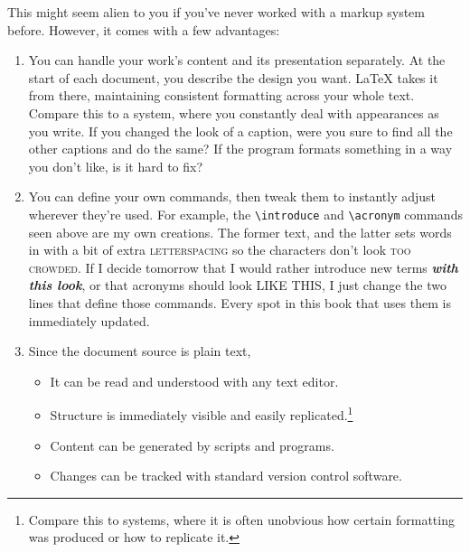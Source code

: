 This might seem alien to you if you've never worked with a markup system before.
However, it comes with a few advantages:
\begin{enumerate}
\item You can handle your work's content and its presentation separately.
    At the start of each document,
    you describe the design you want.
    \LaTeX{} takes it from there, maintaining consistent
    formatting across your whole text.
    Compare this to a  system,
    where you constantly deal with appearances
    as you write.
    If you changed the look of a caption,
    were you sure to find all the other captions and do the
    same?
    If the program formats something in a way you don't like,
    is it hard to fix?%

\item You can define your own commands, then tweak them to instantly adjust
    wherever they're used.
    For example, the \verb|\introduce| and \verb|\acronym| commands seen above
    are my own creations.
    The former  text, and the latter sets words in
     with a bit of extra
    \mbox{\textsc{letterspacing}} so the characters
    don't look \textsc{too crowded}.
    If I decide tomorrow that I would rather introduce new terms
    \textbf{\itshape with this look}, or that acronyms should look
    {\small{} LIKE THIS},
    I just change the two lines that define those commands.
    Every spot in this book that uses them is immediately updated.

\item Since the document source is plain text,
    \begin{itemize}
    \item It can be read and understood with any text editor.
    \item Structure is immediately visible
        and easily replicated.\punckern\footnote{Compare this to
         systems, where it is often unobvious
        how certain formatting was produced or how to replicate it.}
    \item Content can be generated by scripts and programs.
    \item Changes can be tracked with standard version control software.
    \end{itemize}
\end{enumerate}

